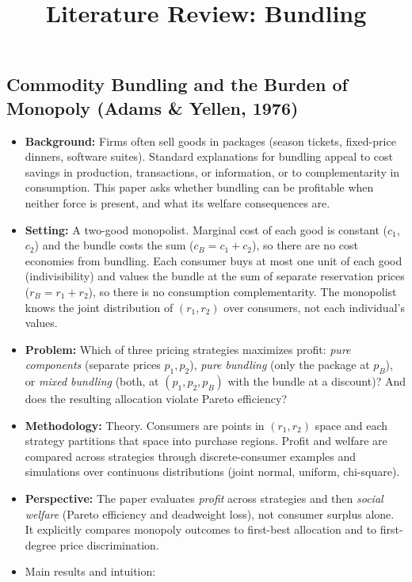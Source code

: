 \documentclass[12pt]{article}
\title{Literature Review: Bundling}
\author{}
\date{}
\begin{document}
\maketitle

\subsection{Commodity Bundling and the Burden of Monopoly (Adams \& Yellen, 1976)}

\begin{itemize}
  \item \textbf{Background:} Firms often sell goods in packages (season tickets, fixed-price dinners, software suites). Standard explanations for bundling appeal to cost savings in production, transactions, or information, or to complementarity in consumption. This paper asks whether bundling can be profitable when neither force is present, and what its welfare consequences are.
  \item \textbf{Setting:} A two-good monopolist. Marginal cost of each good is constant ($c_1$, $c_2$) and the bundle costs the sum ($c_B = c_1 + c_2$), so there are no cost economies from bundling. Each consumer buys at most one unit of each good (indivisibility) and values the bundle at the sum of separate reservation prices ($r_B = r_1 + r_2$), so there is no consumption complementarity. The monopolist knows the joint distribution of $(r_1, r_2)$ over consumers, not each individual's values.
  \item \textbf{Problem:} Which of three pricing strategies maximizes profit: \textit{pure components} (separate prices $p_1, p_2$), \textit{pure bundling} (only the package at $p_B$), or \textit{mixed bundling} (both, at $(p_1, p_2, p_B)$ with the bundle at a discount)? And does the resulting allocation violate Pareto efficiency?
  \item \textbf{Methodology:} Theory. Consumers are points in $(r_1, r_2)$ space and each strategy partitions that space into purchase regions. Profit and welfare are compared across strategies through discrete-consumer examples and simulations over continuous distributions (joint normal, uniform, chi-square).
  \item \textbf{Perspective:} The paper evaluates \textit{profit} across strategies and then \textit{social welfare} (Pareto efficiency and deadweight loss), not consumer surplus alone. It explicitly compares monopoly outcomes to first-best allocation and to first-degree price discrimination.
  \item Main results and intuition:

\end{itemize}
\end{document}
